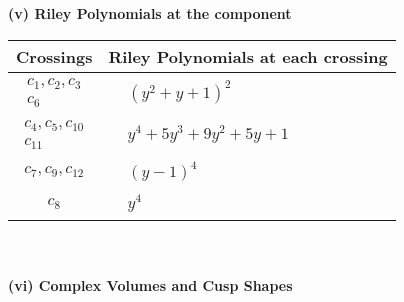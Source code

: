 \documentclass[1p]{elsarticle_modified}
\theoremstyle{definition}
\begin{document}
\newpage\renewcommand{\arraystretch}{1}
\flushleft \textbf{(v) Riley Polynomials at the component}\newline \\
\begin{tabular}{m{50pt}|m{274pt}}
Crossings & \hspace{64pt}Riley Polynomials at each crossing \\
\hline $$\begin{aligned}c_{1},c_{2},c_{3}\\c_{6}\end{aligned}$$&$\begin{aligned}
&(y^2+y+1)^2
\end{aligned}$\\
\hline $$\begin{aligned}c_{4},c_{5},c_{10}\\c_{11}\end{aligned}$$&$\begin{aligned}
&y^4+5 y^3+9 y^2+5 y+1
\end{aligned}$\\
\hline $$\begin{aligned}c_{7},c_{9},c_{12}\end{aligned}$$&$\begin{aligned}
&(y-1)^4
\end{aligned}$\\
\hline $$\begin{aligned}c_{8}\end{aligned}$$&$\begin{aligned}
&y^4
\end{aligned}$\\
\hline
\end{tabular}\\~\\
\newpage\flushleft \textbf{(vi) Complex Volumes and Cusp Shapes}
\end{document}
